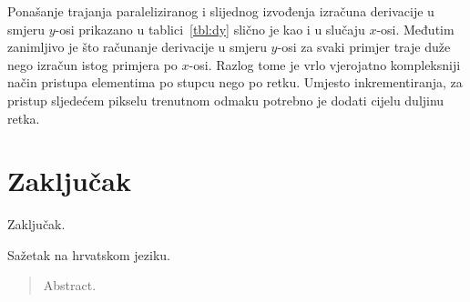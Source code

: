 \documentclass[times, utf8, zavrsni]{fer}
\begin{document}
Ponašanje trajanja paraleliziranog i slijednog izvođenja izračuna derivacije u smjeru \(y\)-osi prikazano u tablici~\ref{tbl:dy} slično je kao i u slučaju \(x\)-osi. Međutim zanimljivo je što računanje derivacije u smjeru \(y\)-osi za svaki primjer traje duže nego izračun istog primjera po \(x\)-osi. Razlog tome je vrlo vjerojatno kompleksniji način pristupa elementima po stupcu nego po retku. Umjesto inkrementiranja, za pristup sljedećem pikselu trenutnom odmaku potrebno je dodati cijelu duljinu retka.

\chapter{Zaključak}
Zaključak.




\begin{sazetak}
Sažetak na hrvatskom jeziku.

\end{sazetak}

\begin{abstract}
Abstract.

\end{abstract}
\end{document}
